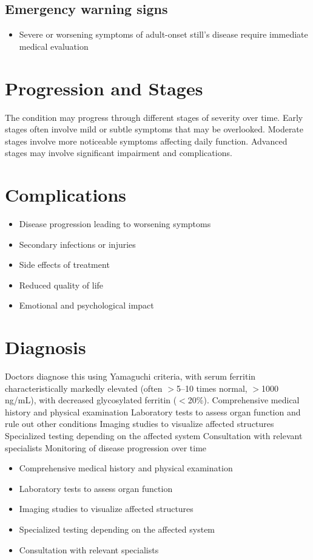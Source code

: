 \subsection{Emergency warning signs}
\begin{itemize}[noitemsep]
  \item Severe or worsening symptoms of adult-onset still's disease require immediate medical evaluation
\end{itemize}
\section{Progression and Stages}
The condition may progress through different stages of severity over time. Early stages often involve mild or subtle symptoms that may be overlooked. Moderate stages involve more noticeable symptoms affecting daily function. Advanced stages may involve significant impairment and complications.
\section{Complications}
\begin{itemize}[noitemsep]
  \item Disease progression leading to worsening symptoms
  \item Secondary infections or injuries
  \item Side effects of treatment
  \item Reduced quality of life
  \item Emotional and psychological impact
\end{itemize}
\section{Diagnosis}
Doctors diagnose this using Yamaguchi criteria, with serum ferritin characteristically markedly elevated (often $>$5--10 times normal, $>$1000 ng/mL), with decreased glycosylated ferritin ($<$20\%). Comprehensive medical history and physical examination Laboratory tests to assess organ function and rule out other conditions Imaging studies to visualize affected structures Specialized testing depending on the affected system Consultation with relevant specialists Monitoring of disease progression over time

\begin{itemize}[noitemsep]
  \item Comprehensive medical history and physical examination
  \item Laboratory tests to assess organ function
  \item Imaging studies to visualize affected structures
  \item Specialized testing depending on the affected system
  \item Consultation with relevant specialists
\end{itemize}

